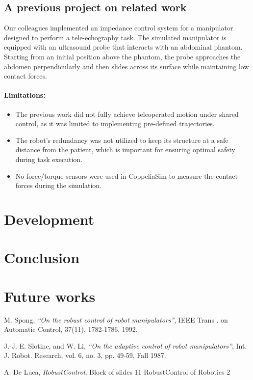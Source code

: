 \documentclass{article}
\begin{document}
\subsection{A previous project on related work}
Our colleagues implemented an impedance control system for a manipulator designed to perform a tele-echography task. The simulated manipulator is equipped with an ultrasound probe that interacts with an abdominal phantom. Starting from an initial position above the phantom, the probe approaches the abdomen perpendicularly and then slides across its surface while maintaining low contact forces.

\paragraph{Limitations:}
\begin{itemize}
\item The previous work did not fully achieve teleoperated motion under shared control, as it was limited to implementing pre-defined trajectories.
\item The robot's redundancy was not utilized to keep its structure at a safe distance from the patient, which is important for ensuring optimal safety during task execution.
\item No force/torque sensors were used in CoppeliaSim to measure the contact forces during the simulation.
\end{itemize}
\par



\section{Development}

\section{Conclusion}

\section{Future works}



\begin{thebibliography}{9}

  M. Spong,
  \emph{“On the robust control of robot manipulators”},
   IEEE Trans . on Automatic Control, 37(11), 1782-1786, 1992.

  J.-J. E. Slotine, and W. Li,
  \emph{“On the adaptive control of robot manipulators”},
  Int. J. Robot. Research, vol. 6, no. 3, pp. 49-59, Fall 1987.
   
  A. De Luca,
  \emph{RobustControl},
 Block of slides 11 RobustControl of Robotics 2

\end{thebibliography}
\end{document}
